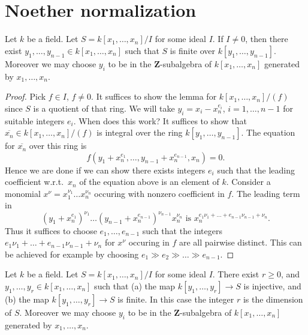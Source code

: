 \section{Noether normalization}
\label{section-Noether-normalization}

\begin{lemma}
\label{lemma-one-relation}
Let $k$ be a field.
Let $S = k[x_1, \ldots, x_n]/I$ for some ideal $I$.
If $I \not= 0$, then there exist $y_1, \ldots, y_{n-1} \in k[x_1, \ldots, x_n]$
such that $S$ is finite over $k[y_1, \ldots, y_{n-1}]$. Moreover we may
choose $y_i$ to be in the $\mathbf{Z}$-subalgebra of $k[x_1, \ldots, x_n]$
generated by $x_1, \ldots, x_n$.
\end{lemma}

\begin{proof}
Pick $f \in I$, $f\not = 0$. It suffices to show the lemma
for $k[x_1, \ldots, x_n]/(f)$ since $S$ is a quotient of that ring.
We will take $y_i = x_i - x_n^{e_i}$, $i = 1, \ldots, n-1$
for suitable integers $e_i$. When does this work? It suffices
to show that $\overline{x_n} \in k[x_1, \ldots, x_n]/(f)$
is integral over the ring $k[y_1, \ldots, y_{n-1}]$. The
equation for $\overline{x_n}$ over this ring is
$$
f(y_1 + x_n^{e_1}, \ldots, y_{n-1} + x_n^{e_{n-1}}, x_n) = 0.
$$
Hence we are done if we can show there exists integers $e_i$ such
that the leading coefficient w.r.t.\ $x_n$ of the equation
above is an element of $k$. Consider a monomial
$x^\nu = x_1^{\nu_1} \ldots x_n^{\nu_n}$ occuring with
nonzero coefficient in $f$. The leading term in
$$
(y_1 + x_n^{e_1})^{\nu_1} \ldots (y_{n-1} + x_n^{e_{n-1}})^{\nu_{n-1}}
x_n^{\nu_n}
\text{\ \ is\ \ }x_n^{e_1\nu_1 + \ldots + e_{n-1}\nu_{n-1} + \nu_n}.
$$
Thus it suffices to choose $e_1, \ldots, e_{n-1}$ such that
the integers $e_1\nu_1 + \ldots + e_{n-1}\nu_{n-1} + \nu_n$
for $x^\nu$ occuring in $f$ are all pairwise distinct.
This can be achieved for example by choosing $e_1 \gg
e_2 \gg \ldots \gg e_{n-1}$.
\end{proof}

\begin{lemma}
\label{lemma-Noether-normalization}
Let $k$ be a field. Let $S = k[x_1, \ldots, x_n]/I$ for some ideal $I$.
There exist $r\geq 0$, and $y_1, \ldots, y_r \in k[x_1, \ldots, x_n]$
such that (a) the map $k[y_1, \ldots, y_r] \to S$ is injective,
and (b) the map $k[y_1, \ldots, y_r] \to S$ is finite.
In this case the integer $r$ is the dimension of $S$.
Moreover we may choose $y_i$ to be in the
$\mathbf{Z}$-subalgebra of $k[x_1, \ldots, x_n]$
generated by $x_1, \ldots, x_n$.
\end{lemma}

